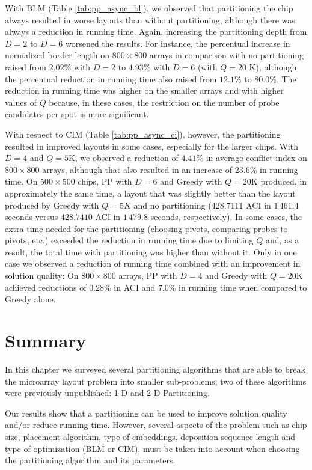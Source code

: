 With BLM (Table \ref{tab:pp_async_bl}), we observed that partitioning the chip
always resulted in worse layouts than without partitioning, although there was
always a reduction in running time. Again, increasing the partitioning depth
from $D=2$ to $D=6$ worsened the results. For instance, the percentual increase
in normalized border length on $800\times 800$ arrays in comparison with no
partitioning raised from $2.02\%$ with $D=2$ to $4.93\%$ with $D=6$ (with $Q=20$
K), although the percentual reduction in running time also raised from $12.1\%$
to $80.0\%$. The reduction in running time was higher on the smaller arrays and
with higher values of $Q$ because, in these cases, the restriction on the number
of probe candidates per spot is more significant.

With respect to CIM (Table \ref{tab:pp_async_ci}), however, the partitioning
resulted in improved layouts in some cases, especially for the larger chips.
With $D=4$ and $Q=5$K, we observed a reduction of $4.41\%$ in average conflict
index on $800\times 800$ arrays, although that also resulted in an increase of
$23.6\%$ in running time. On $500\times 500$ chips, PP with $D=6$ and Greedy
with $Q=20$K produced, in approximately the same time, a layout that was
slightly better than the layout produced by Greedy with $Q=5K$ and no
partitioning ($428.7111$ ACI in $1\,461.4$ seconds versus $428.7410$ ACI in
$1\,479.8$ seconds, respectively). In some cases, the extra time needed for the
partitioning (choosing pivots, comparing probes to pivots, etc.) exceeded the
reduction in running time due to limiting $Q$ and, as a result, the total time
with partitioning was higher than without it. Only in one case we observed a
reduction of running time combined with an improvement in solution quality: On
$800\times 800$ arrays, PP with $D=4$ and Greedy with $Q=20$K achieved
reductions of $0.28\%$ in ACI and $7.0\%$ in running time when compared to
Greedy alone.

\section{Summary}
\label{sec:part_summary}

In this chapter we surveyed several partitioning algorithms that are able to
break the microarray layout problem into smaller sub-problems; two of these
algorithms were previously unpublished: 1-D and 2-D Partitioning.

Our results show that a partitioning can be used to improve solution quality
and/or reduce running time. However, several aspects of the problem such as chip
size, placement algorithm, type of embeddings, deposition sequence length and
type of optimization (BLM or CIM), must be taken into account when choosing the
partitioning algorithm and its parameters.

